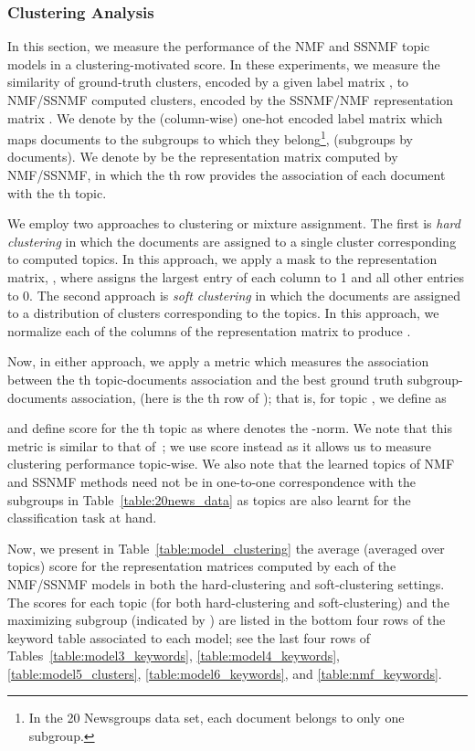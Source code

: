 \documentclass[twocolumn,10pt]{article}
\begin{document}
\subsubsection*{Clustering Analysis}

In this section, we measure the performance of the NMF and SSNMF topic models in a clustering-motivated score.
In these experiments, we measure the similarity of ground-truth clusters, encoded by a given label matrix , to NMF/SSNMF computed clusters, encoded by the SSNMF/NMF representation matrix .
We denote by  the (column-wise) one-hot encoded label matrix which maps documents to the subgroups to which they belong\footnote{In the 20 Newsgroups data set, each document belongs to only one subgroup.},  (subgroups by documents).
We denote by  be the representation matrix computed by NMF/SSNMF, in which the th row provides the association of each document with the th topic.  

We employ two approaches to clustering or mixture assignment.  The first is \emph{hard clustering} in which the documents are assigned to a single cluster corresponding to computed topics.  In this approach, we apply a mask to the representation matrix, , where  assigns the largest entry of each column to 1 and all other entries to 0.  The second approach is \emph{soft clustering} in which the documents are assigned to a distribution of clusters corresponding to the topics.  In this approach, we normalize each of the columns of the representation matrix to produce .  

Now, in either approach, we apply a metric  which measures the association between the th topic-documents association  and the best ground truth subgroup-documents association,  (here  is the th row of ); that is, for topic , we define  as

and define score  for the th topic as 
where  denotes the -norm.
We note that this metric is similar to that of~\cite{xu2003document}; we use score  instead as it allows us to measure clustering performance topic-wise.   
We also note that the learned topics of NMF and SSNMF methods need not be in one-to-one correspondence with the subgroups in Table~\ref{table:20news_data} as topics are also learnt for the classification task at hand.

Now, we present in Table~\ref{table:model_clustering} the average (averaged over topics) score  for the representation matrices computed by each of the NMF/SSNMF models in both the hard-clustering and soft-clustering settings.  The scores  for each topic (for both hard-clustering and soft-clustering) and the maximizing subgroup (indicated by ) are listed in the bottom four rows of the keyword table associated to each model; see the last four rows of 
Tables~\ref{table:model3_keywords}, \ref{table:model4_keywords}, \ref{table:model5_clusters}, \ref{table:model6_keywords}, and \ref{table:nmf_keywords}.
\end{document}

